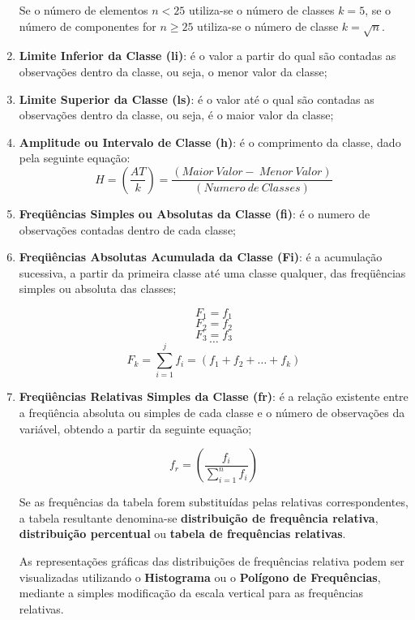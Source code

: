 \begin{enumerate}
Se o número de elementos $n < 25$  utiliza-se o número de classes $k= 5$, se o número de componentes for
$n \geq 25$  utiliza-se o número de classe $k=\sqrt{n}$.
  \item \textbf{Limite Inferior da Classe (li)}: é o valor a partir do qual são contadas as observações dentro da classe, ou seja, o menor valor da classe;
  \item \textbf{Limite Superior da Classe (ls)}: é o valor até o qual são contadas as observações dentro da classe, ou seja, é o maior valor da classe;
  \item \textbf{Amplitude ou Intervalo de Classe (h)}: é o comprimento da classe, dado pela seguinte equação:
      \begin{equation}\label{}
        H= \left( \frac{AT}{k} \right) = \frac{(Maior \ Valor - \ Menor \ Valor)}{(Numero \ de \ Classes)}
      \end{equation}
  \item \textbf{Freqüências Simples ou Absolutas da Classe (fi)}: é o numero de observações contadas dentro de cada classe;
  \item \textbf{Freqüências Absolutas Acumulada da Classe (Fi)}: é a acumulação sucessiva, a partir da primeira classe até uma classe qualquer, das freqüências simples ou absoluta das classes;


      $$ F_{1}= f_{1} $$
      $$ F_{2}= f_{2} $$
      $$ F_{3}= f_{3} $$
      $$ \ldots  $$
      $$ F_{k}=  \sum_{i=1}^{j}f_{i} = (f_{1}+f_{2}+\ldots+ f_{k})$$


  \item \textbf{Freqüências Relativas Simples da Classe (fr)}: é a relação existente entre a freqüência absoluta ou simples de cada classe e o número de observações da variável, obtendo a partir da seguinte equação;

      \begin{equation}\label{}
        f_{r} = \left( \frac{f_{i}}{\sum_{i=1}^{n}f_{i}} \right)
      \end{equation}

Se as frequências da tabela forem substituídas pelas relativas correspondentes, a tabela resultante denomina-se \textbf{distribuição de frequência relativa}, \textbf{distribuição percentual} ou \textbf{tabela de frequências relativas}.\vskip0.3cm

As representações gráficas das distribuições de frequências relativa podem ser visualizadas utilizando o \textbf{Histograma} ou o \textbf{Polígono de Frequências}, mediante a simples modificação da escala vertical para as frequências relativas.




\end{enumerate}
